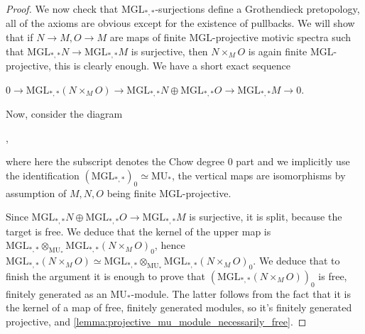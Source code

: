 \documentclass[oneside,a4paper]{amsart}
\newcommand{\MU}{\mathrm{MU}} %
\newcommand{\MGL}{\mathrm{MGL}} %
\theoremstyle{plain}
\theoremstyle{definition}
\theoremstyle{remark}
\begin{document}
\begin{proof}
We now check that $\MGL_{*, *}$-surjections define a Grothendieck pretopology, all of the axioms are obvious except for the existence of pullbacks. We will show that if $N \rightarrow M, O \rightarrow M$ are maps of finite $\MGL$-projective motivic spectra such that $\MGL_{*, *} N \rightarrow \MGL_{*, *} M$ is surjective, then $N \times_{M} O$ is again finite $\MGL$-projective, this is clearly enough. We have a short exact sequence

\begin{center}
$0 \rightarrow \MGL_{*, *} (N \times _{M} O) \rightarrow \MGL_{*, *}N \oplus \MGL_{*, *}O \rightarrow \MGL_{*, *} M \rightarrow 0$.
\end{center} 
Now, consider the diagram

\begin{center}
	,
\end{center} 
where here the subscript denotes the Chow degree $0$ part and we implicitly use the identification $(\MGL_{*, *})_{0} \simeq \MU_{*}$, the vertical maps are isomorphisms by assumption of $M, N, O$ being finite $\MGL$-projective. 

Since $\MGL_{*, *} N \oplus \MGL_{*, *} O \rightarrow \MGL_{*, *} M$ is surjective, it is split, because the target is free. We deduce that the kernel of the upper map is $\MGL_{*, *} \otimes _{\MU_{*}} \MGL_{*, *} (N \times _{M} O)_{0}$, hence $\MGL_{*, *} (N \times _{M} O) \simeq \MGL_{*, *} \otimes _{\MU_{*}} \MGL_{*, *} (N \times _{M} O)_{0}$. We deduce that to finish the argument it is enough to prove that $(\MGL_{*, *} (N \times _{M} O))_{0}$ is free, finitely generated as an $\MU_{*}$-module. The latter follows from the fact that it is the kernel of a map of free, finitely generated modules, so it's finitely generated projective, and \cref{lemma:projective_mu_module_necessarily_free}.


\end{proof}
\end{document}
